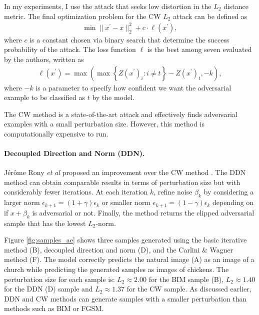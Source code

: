 In my experiments, I use the attack that seeks low distortion in the $L_{2}$
distance metric. The final optimization problem for the CW $L_{2}$ attack can be
defined as
\begin{align} \label{eq:cw_min}
    \min{\lVert x^{\prime}-x\lVert_{2}^{2}+c\cdot\ell(x^{\prime})},
\end{align}
where $c$ is a constant chosen via binary search that determine the success
probability of the attack. The loss function $\ell$ is the best among seven
evaluated by the authors, written as
\begin{align} \label{eq:cw_lf}
    \ell(x^{\prime})=\max{\left(\max{\left\{ Z(x^{\prime})_{i}:i\neq t\right\} }-Z(x^{\prime})_{t},-k\right)},
\end{align}
where $-k$ is a parameter to specify how confident we want the adversarial
example to be classified as $t$ by the model.

The CW method is a state-of-the-art attack and effectively finds adversarial
examples with a small perturbation size. However, this method is computationally
expensive to run.

\paragraph{Decoupled Direction and Norm (DDN).}
Jérôme Rony \emph{et al} proposed an improvement over the CW method
\cite{rony_decoupling_2019}. The DDN method can obtain comparable results in
terms of perturbation size but with considerably fewer iterations. At each
iteration $k$, refine noise $\beta_{k}$ by considering a larger norm
$\epsilon_{k+1}=(1+\gamma)\epsilon_{k}$ or smaller norm
$\epsilon_{k+1}=(1-\gamma)\epsilon_{k}$ depending on if $x+\beta_{k}$ is
adversarial or not. Finally, the method returns the clipped adversarial sample
that has the lowest $L_{2}$-norm.

Figure \ref{fig:samples_ae} shows three samples generated using the basic
iterative method (B), decoupled direction and norm (D), and the Carlini \&
Wagner method (F). The model correctly predicts the natural image (A) as an
image of a church while predicting the generated samples as images of chickens.
The perturbation size for each sample is: $L_2 \approx 2.00$ for the BIM sample
(B), $L_2 \approx 1.40$ for the DDN (D) sample and $L_2 \approx 1.37$ for the CW
sample. As discussed earlier, DDN and CW methods can generate samples with a
smaller perturbation than methods such as BIM or FGSM.

